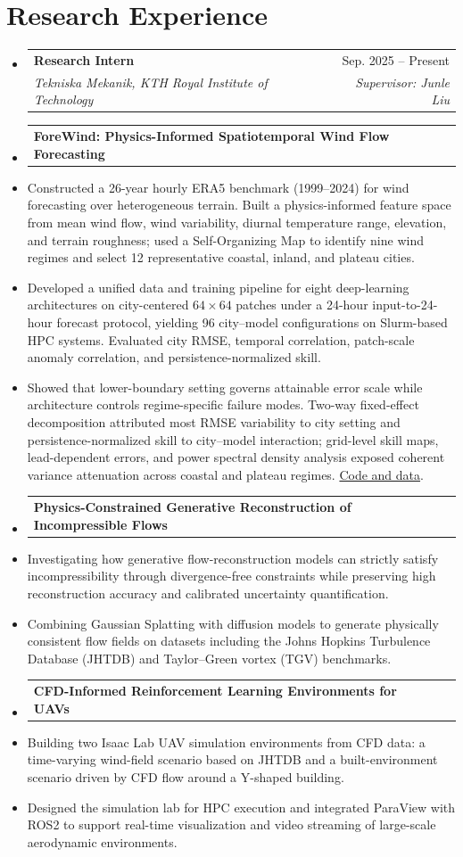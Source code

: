 \documentclass[11pt, letterpaper]{article}
\makeatletter
\newcommand{\resumeItem}[1]{
  \item\small{
    {#1 \vspace{-2pt}}
  }
}
\newcommand{\resumeSubheading}[4]{
  \vspace{-1pt}\item
    \begin{tabular*}{\linewidth}[t]{@{\extracolsep{\fill}}lr@{}}
      \textbf{#1} & #2 \\
      \textit{\small#3} & \textit{\small #4} \\
    \end{tabular*}\vspace{-5pt}
}
\newcommand{\resumeProjectHeading}[2]{
    \Needspace{4\baselineskip}
    \item
    \begin{tabularx}{\linewidth}{@{}>{\raggedright\arraybackslash}Xr@{}}
      \small#1 & #2 \\
    \end{tabularx}\vspace{-5pt}
}
\makeatother
\begin{document}
\section{Research Experience}
  \begin{itemize}[leftmargin=0.15in, label={}]
    \resumeSubheading
      {Research Intern}{Sep. 2025 -- Present}
      {Tekniska Mekanik, KTH Royal Institute of Technology}{Supervisor: Junle Liu}
    \resumeProjectHeading
      {\textbf{ForeWind: Physics-Informed Spatiotemporal Wind Flow Forecasting}}{}
      \resumeItem{Constructed a 26-year hourly ERA5 benchmark (1999--2024) for wind forecasting over heterogeneous terrain. Built a physics-informed feature space from mean wind flow, wind variability, diurnal temperature range, elevation, and terrain roughness; used a Self-Organizing Map to identify nine wind regimes and select 12 representative coastal, inland, and plateau cities.}
      \resumeItem{Developed a unified data and training pipeline for eight deep-learning architectures on city-centered $64 \times 64$ patches under a 24-hour input-to-24-hour forecast protocol, yielding 96 city--model configurations on Slurm-based HPC systems. Evaluated city RMSE, temporal correlation, patch-scale anomaly correlation, and persistence-normalized skill.}
      \resumeItem{Showed that lower-boundary setting governs attainable error scale while architecture controls regime-specific failure modes. Two-way fixed-effect decomposition attributed most RMSE variability to city setting and persistence-normalized skill to city--model interaction; grid-level skill maps, lead-dependent errors, and power spectral density analysis exposed coherent variance attenuation across coastal and plateau regimes. \href{https://github.com/LIUJUNLE97/forewind}{Code and data}.}

    \resumeProjectHeading
      {\textbf{Physics-Constrained Generative Reconstruction of Incompressible Flows}}{}
      \resumeItem{Investigating how generative flow-reconstruction models can strictly satisfy incompressibility through divergence-free constraints while preserving high reconstruction accuracy and calibrated uncertainty quantification.}
      \resumeItem{Combining Gaussian Splatting with diffusion models to generate physically consistent flow fields on datasets including the Johns Hopkins Turbulence Database (JHTDB) and Taylor--Green vortex (TGV) benchmarks.}

    \resumeProjectHeading
      {\textbf{CFD-Informed Reinforcement Learning Environments for UAVs}}{}
      \resumeItem{Building two Isaac Lab UAV simulation environments from CFD data: a time-varying wind-field scenario based on JHTDB and a built-environment scenario driven by CFD flow around a Y-shaped building.}
      \resumeItem{Designed the simulation lab for HPC execution and integrated ParaView with ROS2 to support real-time visualization and video streaming of large-scale aerodynamic environments.}


\end{itemize}
\end{document}
